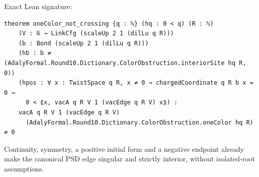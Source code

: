 \begin{theorem}[bp-224]
\begin{itemize}
\end{itemize}
\par Exact Lean signature:
\begin{verbatim}
theorem oneColor_not_crossing {q : ℕ} (hq : 0 < q) (R : ℕ)
    (V : ℝ → LinkCfg (scaleUp 2 1 (dilLu q R)))
    (b : Bond (scaleUp 2 1 (dilLu q R)))
    (hb : b ≠ (AdalyFormal.Round10.Dictionary.ColorObstruction.interiorSite hq R, 0))
    (hpos : ∀ x : TwistSpace q R, x ≠ 0 → chargedCoordinate q R b x = 0 →
      0 < ⟪x, vacA q R V 1 (vacEdge q R V) x⟫) :
    vacA q R V 1 (vacEdge q R V)
      (AdalyFormal.Round10.Dictionary.ColorObstruction.oneColor hq R) ≠ 0
\end{verbatim}
\end{theorem}

\begin{theorem}[bp-225]
\label{bp-225}
\uses{}
\leanok
Continuity, symmetry, a positive initial form and a negative endpoint already make the canonical PSD edge singular and strictly interior, without isolated-root assumptions.


\end{theorem}
